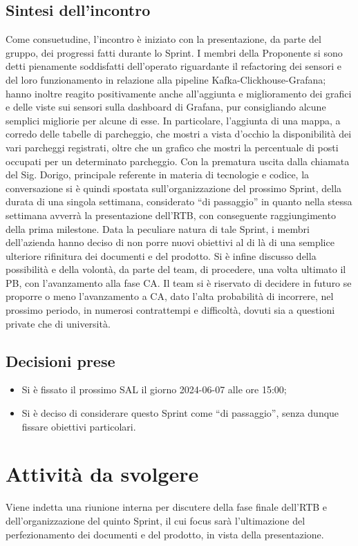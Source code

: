 \documentclass[8pt]{article}
\newcommand{\signatureline}[1]{%
	 \par\vspace{0.5cm}
	\noindent\makebox[\linewidth][r]{\rule{0.2\textwidth}{0.5pt}\hspace{3cm}\makebox[0pt][r]{\vspace{3pt}\footnotesize #1}}%
}
\begin{document}
\subsection{Sintesi dell'incontro}
Come consuetudine, l'incontro è iniziato con la presentazione, da parte del gruppo, dei progressi fatti durante lo Sprint. I membri della
Proponente si sono detti pienamente soddisfatti dell'operato riguardante il refactoring dei sensori e del loro funzionamento in relazione
alla pipeline Kafka-Clickhouse-Grafana; hanno inoltre reagito positivamente anche all'aggiunta e miglioramento dei grafici e delle viste
sui sensori sulla dashboard di Grafana, pur consigliando alcune semplici migliorie per alcune di esse. In particolare, l'aggiunta di una
mappa, a corredo delle tabelle di parcheggio, che mostri a vista d'occhio la disponibilità dei vari parcheggi registrati, oltre che un
grafico che mostri la percentuale di posti occupati per un determinato parcheggio. Con la prematura uscita dalla chiamata del Sig. Dorigo,
principale referente in materia di tecnologie e codice, la conversazione si è quindi spostata sull'organizzazione del prossimo Sprint, della
durata di una singola settimana, considerato ``di passaggio'' in quanto nella stessa settimana avverrà la presentazione dell'RTB, con conseguente
raggiungimento della prima milestone. Data la peculiare natura di tale Sprint, i membri dell'azienda hanno deciso di non porre nuovi obiettivi
al di là di una semplice ulteriore rifinitura dei documenti e del prodotto. Si è infine discusso della possibilità e della volontà, da parte del 
team, di procedere, una volta ultimato il PB, con l'avanzamento alla fase CA. Il team si è riservato di decidere in futuro se proporre o meno 
l'avanzamento a CA, dato l'alta probabilità di incorrere, nel prossimo periodo, in numerosi contrattempi e difficoltà, dovuti sia a questioni 
private che di università. 

\subsection{Decisioni prese}
\begin{itemize}
	\setlength\itemsep{0em}
	\item Si è fissato il prossimo SAL il giorno 2024-06-07 alle ore 15:00;
	\item Si è deciso di considerare questo Sprint come ``di passaggio'', senza dunque fissare obiettivi particolari.
\end{itemize}
\newpage
\section{Attività da svolgere}
Viene indetta una riunione interna per discutere della fase finale dell'RTB e dell'organizzazione del quinto Sprint, il cui focus
sarà l'ultimazione del perfezionamento dei documenti e del prodotto, in vista della presentazione. 
\signatureline{Padova, 2024-06-04}
\end{document}

